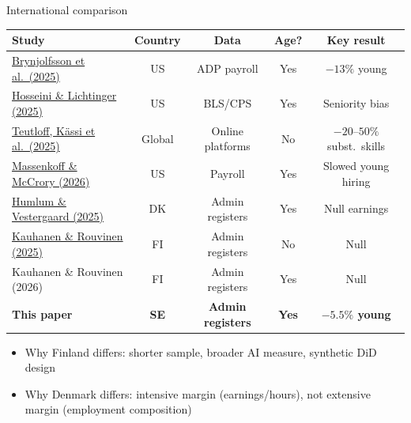 \documentclass[aspectratio=169,11pt]{beamer}
\begin{document}
\begin{frame}{International comparison}
\begin{center}
\footnotesize
\begin{tabular}{lcccc}
\toprule
\textbf{Study} & \textbf{Country} & \textbf{Data} & \textbf{Age?} & \textbf{Key result} \\
\midrule
\href{https://digitaleconomy.stanford.edu/publications/canaries-in-the-coal-mine/}{Brynjolfsson et al.\ (2025)} & US & ADP payroll & Yes & $-13\%$ young \\
\href{https://papers.ssrn.com/sol3/papers.cfm?abstract_id=5425555}{Hosseini \& Lichtinger (2025)} & US & BLS/CPS & Yes & Seniority bias \\
\href{https://www.sciencedirect.com/science/article/pii/S0167268124004591}{Teutloff, Kässi et al.\ (2025)} & Global & Online platforms & No & $-20$--$50\%$ subst.\ skills \\
\href{https://www.anthropic.com/research/labor-market-impacts}{Massenkoff \& McCrory (2026)} & US & Payroll & Yes & Slowed young hiring \\
\href{https://www.nber.org/papers/w33777}{Humlum \& Vestergaard (2025)} & DK & Admin registers & Yes & Null earnings \\
\href{https://research.aalto.fi/files/184802089/BIZ_Kauhanen_Rouvinen_Assessing_early_labour_market_effects_of_generative_AI_evidence_from_population_data_2025_pdfa2b.pdf}{Kauhanen \& Rouvinen (2025)} & FI & Admin registers & No & Null \\
Kauhanen \& Rouvinen (2026) & FI & Admin registers & Yes & Null \\
\textbf{This paper} & \textbf{SE} & \textbf{Admin registers} & \textbf{Yes} & \textbf{$-5.5\%$ young} \\
\bottomrule
\end{tabular}
\end{center}
\vspace{2mm}
\begin{itemize}
    \footnotesize
    \item Why Finland differs: shorter sample, broader AI measure, synthetic DiD design
    \item Why Denmark differs: intensive margin (earnings/hours), not extensive margin (employment composition)
\end{itemize}
\end{frame}
\end{document}

